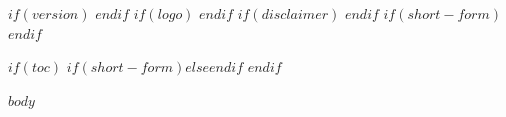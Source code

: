 \documentclass[$if(fontsize)$$fontsize$$else$11pt$endif$]{article}
\begin{document}
\newcommand{\doctitle}{$title$}
\newcommand{\docauthor}{$author$}
\newcommand{\docdate}{$date$}
$if(version)$
\newcommand{\docversion}{$version$}
$endif$
$if(logo)$
\newcommand{\doclogo}{$logo$}
$endif$
$if(disclaimer)$
\newcommand{\docdisclaimer}{$disclaimer$}
$endif$
\newcommand{\doclogowidth}{$if(logo-width)$$logo-width$$else$0.8$endif$}
\newcommand{\doctppostrule}{$if(titlepage-post-rule)$$titlepage-post-rule$$else$2em$endif$}
\newcommand{\doctpposttitle}{$if(titlepage-post-title)$$titlepage-post-title$$else$0.75em$endif$}
\newcommand{\doctppostauthor}{$if(titlepage-post-author)$$titlepage-post-author$$else$0.5em$endif$}
\newcommand{\doctppostdate}{$if(titlepage-post-date)$$titlepage-post-date$$else$3em$endif$}
$if(short-form)$
\newcommand{\docshortform}{}
$endif$
\newcommand{\docsfimageheight}{$if(short-form-image-height)$$short-form-image-height$$else$2.2in$endif$}
\newcommand{\docsfimagewidth}{$if(short-form-image-width)$$short-form-image-width$$else$1.0$endif$}


$if(toc)$
\renewcommand{\contentsname}{Table of Contents}
\setcounter{tocdepth}{$if(toc-depth)$$toc-depth$$else$2$endif$}
\tableofcontents
$if(short-form)$$else$\newpage$endif$
$endif$

$body$
\end{document}
